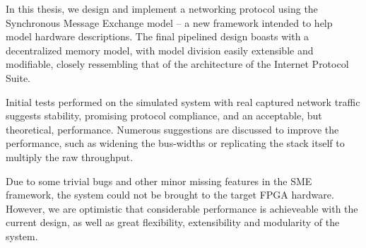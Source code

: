 In this thesis, we design and implement a networking protocol using the
Synchronous Message Exchange model -- a new framework intended to help model
hardware descriptions.
The final pipelined design boasts with a decentralized memory model, with model
division easily extensible and modifiable, closely ressembling that of the
architecture of the Internet Protocol Suite.

Initial tests performed on the simulated system with real captured network
traffic suggests stability, promising protocol compliance, and an acceptable, but
theoretical, performance. Numerous suggestions are discussed to improve the performance,
such as widening the bus-widths or replicating the stack itself to multiply the
raw throughput.

Due to some trivial bugs and other minor missing features in the SME framework,
the system could not be brought to the target FPGA hardware. However, we are
optimistic that considerable performance is achieveable with the current design,
as well as great flexibility, extensibility and modularity of the system.


